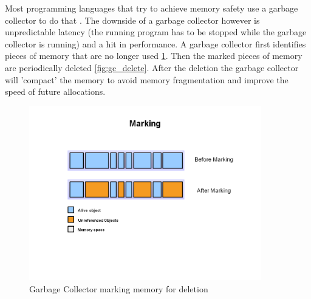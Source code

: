 Most programming languages that try to achieve memory safety use a garbage collector to do that \cite{java_garbage_collector}.
The downside of a garbage collector however is unpredictable latency (the running program has to be stopped while the garbage collector is running) and a hit in performance.
A garbage collector first identifies pieces of memory that are no longer used \ref{fig:gc_mark}.
Then the marked pieces of memory are periodically deleted \ref{fig:gc_delete}.
After the deletion the garbage collector will 'compact' the memory to avoid memory fragmentation and improve the speed of future allocations.

\begin{figure}[htb]
    \centering
    \includegraphics[width=0.9\textwidth]{figures/fundamentals_garbage_collector_marking.PNG}
    \caption[Illustration: Garbage Collector marking memory for deletion\\Source: https://www.oracle.com/webfolder/technetwork/tutorials/obe/java/gc01/images/gcslides/Slide3.png]{Garbage Collector marking memory for deletion}
    \label{fig:gc_mark}
\end{figure}

